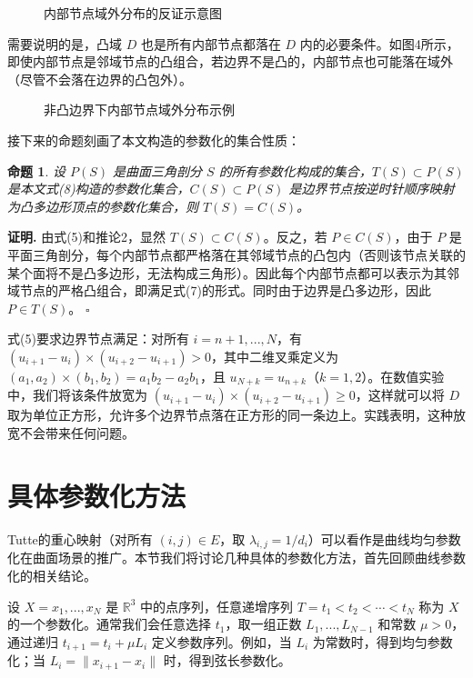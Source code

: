 \documentclass{ctexart}
\newtheorem{proposition}{命题}
\theoremstyle{proof}
\newenvironment{proof}{\noindent\textbf{证明.}}{\hfill$\square$\par}
\begin{document}
\begin{figure}[htbp]
    \centering
    \caption{内部节点域外分布的反证示意图}
    \label{fig:3}
\end{figure}

需要说明的是，凸域 $D$ 也是所有内部节点都落在 $D$ 内的必要条件。如图4所示，即使内部节点是邻域节点的凸组合，若边界不是凸的，内部节点也可能落在域外（尽管不会落在边界的凸包外）。

\begin{figure}[htbp]
    \centering
    \caption{非凸边界下内部节点域外分布示例}
    \label{fig:4}
\end{figure}

接下来的命题刻画了本文构造的参数化的集合性质：

\begin{proposition}
设 $P(S)$ 是曲面三角剖分 $S$ 的所有参数化构成的集合，$T(S) \subset P(S)$ 是本文式(8)构造的参数化集合，$C(S) \subset P(S)$ 是边界节点按逆时针顺序映射为凸多边形顶点的参数化集合，则 $T(S)=C(S)$。
\end{proposition}

\begin{proof}
由式(5)和推论2，显然 $T(S) \subset C(S)$。反之，若 $P \in C(S)$，由于 $P$ 是平面三角剖分，每个内部节点都严格落在其邻域节点的凸包内（否则该节点关联的某个面将不是凸多边形，无法构成三角形）。因此每个内部节点都可以表示为其邻域节点的严格凸组合，即满足式(7)的形式。同时由于边界是凸多边形，因此 $P \in T(S)$。
\end{proof}

式(5)要求边界节点满足：对所有 $i=n+1,...,N$，有 $(u_{i+1}-u_i) \times (u_{i+2}-u_{i+1})>0$，其中二维叉乘定义为 $(a_1,a_2) \times (b_1,b_2)=a_1b_2-a_2b_1$，且 $u_{N+k}=u_{n+k}$（$k=1,2$）。在数值实验中，我们将该条件放宽为 $(u_{i+1}-u_i) \times (u_{i+2}-u_{i+1})≥0$，这样就可以将 $D$ 取为单位正方形，允许多个边界节点落在正方形的同一条边上。实践表明，这种放宽不会带来任何问题。

\section{具体参数化方法}
Tutte的重心映射（对所有 $(i,j) \in E$，取 $\lambda_{i,j}=1/d_i$）可以看作是曲线均匀参数化在曲面场景的推广。本节我们将讨论几种具体的参数化方法，首先回顾曲线参数化的相关结论。

设 $X={x_1,...,x_N}$ 是 $\mathbb{R}^3$ 中的点序列，任意递增序列 $T={t_1<t_2<\cdots<t_N}$ 称为 $X$ 的一个参数化。通常我们会任意选择 $t_1$，取一组正数 $L_1,...,L_{N-1}$ 和常数 $\mu>0$，通过递归 $t_{i+1}=t_i+\mu L_i$ 定义参数序列。例如，当 $L_i$ 为常数时，得到均匀参数化；当 $L_i=\|x_{i+1}-x_i\|$ 时，得到弦长参数化\cite{farin1988}。
\end{document}

